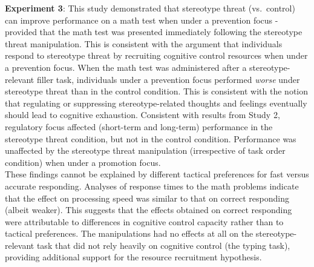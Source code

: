 \documentclass[
  doc, a4paper]{apa7}
\begin{document}
\textbf{Experiment 3}:
This study demonstrated that stereotype threat (vs.~control) can improve performance on a math test when under a prevention focus - provided that the math test was presented immediately following the stereotype threat manipulation. This is consistent with the argument that individuals respond to stereotype threat by recruiting cognitive control resources when under a prevention focus. When the math test was administered after a stereotype-relevant filler task, individuals under a prevention focus performed \emph{worse} under stereotype threat than in the control condition. This is consistent with the notion that regulating or suppressing stereotype-related thoughts and feelings eventually should lead to cognitive exhaustion. Consistent with results from Study 2, regulatory focus affected (short-term and long-term) performance in the stereotype threat condition, but not in the control condition. Performance was unaffected by the stereotype threat manipulation (irrespective of task order condition) when under a promotion focus.\\
These findings cannot be explained by different tactical preferences for fast versus accurate responding. Analyses of response times to the math problems indicate that the effect on processing speed was similar to that on correct responding (albeit weaker). This suggests that the effects obtained on correct responding were attributable to differences in cognitive control capacity rather than to tactical preferences. The manipulations had no effects at all on the stereotype-relevant task that did not rely heavily on cognitive control (the typing task), providing additional support for the resource recruitment hypothesis.
\end{document}
